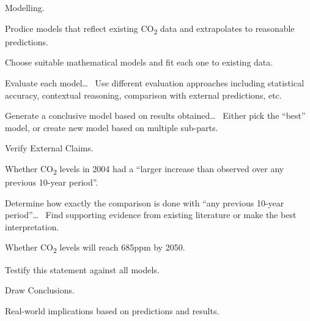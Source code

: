 \documentclass{mcmthesis}
\begin{document}
    \begin{adjustwidth}{1cm}{}

        \noindent Modelling.

        \vspace{-6pt}
        \noindent Prodice models that reflect existing CO\textsubscript{2} data and extrapolates to reasonable predictions.

        \begin{adjustwidth}{1cm}{}
            \noindent Choose suitable mathematical models and fit each one to existing data.

            \noindent Evaluate each model\ldots~
            Use different evaluation approaches including statistical accuracy, contextual reasoning, comparison with external predictions, etc.

            \noindent Generate a conclusive model based on results obtained\ldots~
            Either pick the ``best'' model, or create new model based on multiple sub-parts.
        \end{adjustwidth}

        \noindent Verify External Claims.

        \begin{adjustwidth}{1cm}{}
            \noindent Whether CO\textsubscript{2} levels in 2004 had a ``larger increase than observed over any previous 10-year period''.

            \begin{adjustwidth}{1cm}{}
                \noindent Determine how exactly the comparison is done with ``any previous 10-year period''\ldots~
                Find supporting evidence from existing literature or make the best interpretation.
            \end{adjustwidth}

            \noindent Whether CO\textsubscript{2} levels will reach 685ppm by 2050.

            \begin{adjustwidth}{1cm}{}
                \noindent Testify this statement against all models.
            \end{adjustwidth}

        \end{adjustwidth}

        \noindent Draw Conclusions.

        \vspace{-6pt}
        \noindent Real-world implications based on predictions and results.

    \end{adjustwidth}
\end{document}
